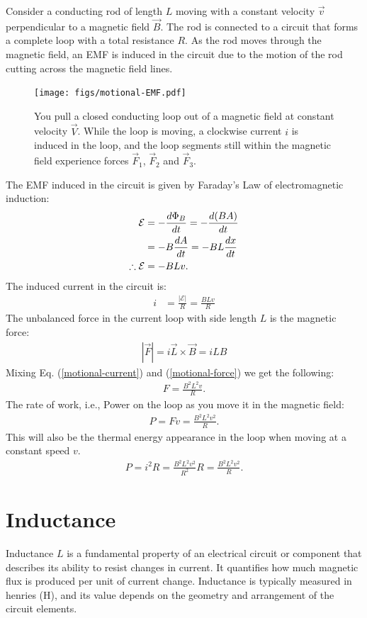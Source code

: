 \documentclass[12pt,b4paper]{article}
\begin{document}
Consider a conducting rod of length $L$ moving with a constant velocity $\vec{v}$ perpendicular to a magnetic field $\vec{B}$. The rod is connected to a circuit that forms a complete loop with a total resistance $R$. As the rod moves through the magnetic field, an EMF is induced in the circuit due to the motion of the rod cutting across the magnetic field lines.
\begin{figure}[H]
    \centering
    \texttt{[image: figs/motional-EMF.pdf]}
    \caption{You pull a closed conducting loop out of a magnetic field at constant velocity $\vec{V}$. While the loop is moving, a clockwise current $i$ is induced in the loop, and the loop segments still within the magnetic field experience forces $\vec{F}_1$, $\vec{F}_2$ and $\vec{F}_3$.}
    \label{fig:emotional-EMF-def}
\end{figure}
The EMF induced in the circuit is given by Faraday's Law of electromagnetic induction:
\begin{align}
    \mathcal{E}&=-\frac{d\Phi_B}{dt}=-\frac{d(BA)}{dt}\notag\\
    &=-B\frac{dA}{dt}=-BL\frac{dx}{dt}\notag\\
    \therefore\mathcal{E}&=-BLv.
\end{align}
The induced current in the circuit is:
\begin{align}
    i&=\frac{\left|\mathcal{E}\right|}{R}=\frac{BLv}{R}\label{motional-current}
\end{align}
The unbalanced force in the current loop with side length $L$ is the magnetic force:
\begin{align}
    |\vec{F}|=i\vec{L}\times\vec{B}=iLB\label{motional-force}
\end{align}
Mixing Eq. (\ref{motional-current}) and (\ref{motional-force}) we get the following:
\begin{align}
    F=\frac{B^2L^2v}{R}.
\end{align}
The rate of work, i.e., Power on the loop as you move it in the magnetic field:
\begin{align}
    P=Fv=\frac{B^2L^2v^2}{R}.
\end{align}
This will also be the thermal energy appearance in the loop when moving at a constant speed $v$.
\begin{align}
    P=i^2R=\frac{B^2L^2v^2}{R^2}R=\frac{B^2L^2v^2}{R}.
\end{align}
\section{Inductance}
Inductance $L$ is a fundamental property of an electrical circuit or component that describes its ability to resist changes in current. It quantifies how much magnetic flux is produced per unit of current change. Inductance is typically measured in henries (\unit{\henry}), and its value depends on the geometry and arrangement of the circuit elements.
\end{document}
